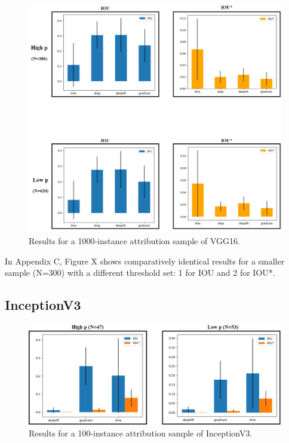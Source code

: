\documentclass[main]{subfiles}
\begin{document}
\begin{figure}[h]\centering
\vfill
\includegraphics[scale=0.32]{vgg_0_5_and_1.png}
\caption{Results for a 1000-instance attribution sample of VGG16. }
\label{vggAfig}
\vfill
\end{figure}

In Appendix C, Figure X shows comparatively identical results for a smaller sample (N=300) with a different threshold set: 1 for IOU and 2 for IOU*.

\newpage


\subsection{InceptionV3}

\begin{figure}[h]
\centering
\includegraphics[scale=0.35]{inception.png}
\caption{Results for a 100-instance attribution sample of InceptionV3. }
\label{inceptionFig}
\end{figure}
\end{document}
